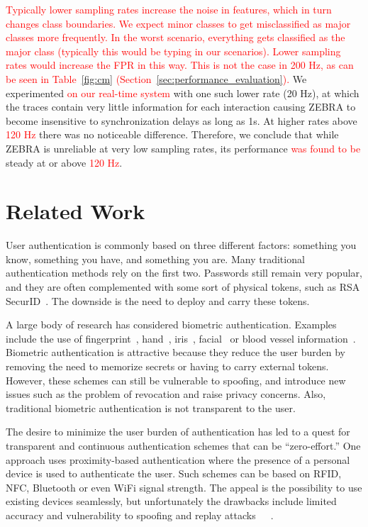 \documentclass[conference]{IEEEtran}
\newcommand{\zebra}{ZEBRA\xspace}
\newcommand\changeMika[1]{\textcolor{red}{#1}}
\newcommand\changeMika[1]{{#1}}
\begin{document}
\changeMika{Typically lower sampling rates increase the noise in features, which in turn changes class boundaries. We expect minor classes to get misclassified as major classes more frequently. In the worst scenario, everything gets classified as the major class (typically this would be typing in our scenarios). Lower sampling rates would increase the FPR in this way. This is not the case in 200 Hz, as can be seen in Table~\ref{fig:cm} (Section~\ref{sec:performance_evaluation}).}
We experimented \changeMika{on our real-time system} with one such lower rate (20 Hz), at which the traces contain very little information for each interaction causing \zebra to become insensitive to synchronization delays as long as 1s. 
At higher rates above \changeMika{120 Hz} there was no noticeable difference. Therefore, we conclude that while \zebra is unreliable at very low sampling rates, its performance \changeMika{was found to be} steady at or above \changeMika{120 Hz}. 





 
\section{Related Work}

User authentication is commonly based on three different factors: something you know, something you have, and something you are. Many traditional authentication methods rely on the first two. Passwords still remain very popular, and they are often complemented with some sort of physical tokens, such as RSA SecurID~\cite{securid}. The downside is the need to deploy and carry these tokens. 

A large body of research has considered biometric authentication. Examples include the use of fingerprint~\cite{clancy2003secure}, hand~\cite{kumar2009personal}, iris~\cite{chong2005iris}, facial~\cite{beumier2000automatic} or blood vessel information~\cite{watanabe2005palm}. Biometric authentication is attractive because they reduce the user burden by removing the need to memorize secrets or having to carry external tokens. However, these schemes can still be vulnerable to spoofing, and introduce new issues such as the problem of revocation and raise privacy concerns. Also, traditional biometric authentication is not transparent to the user.

The desire to minimize the user burden of authentication has led to a quest for transparent and continuous authentication schemes that can be ``zero-effort.'' One approach uses proximity-based authentication where the presence of a personal device is used to authenticate the user. Such schemes can be based on RFID, NFC, Bluetooth or even WiFi signal strength. The appeal is the possibility to use existing devices seamlessly, but unfortunately the drawbacks include limited accuracy and vulnerability to spoofing and replay attacks~\cite{hancke2005practical}~\cite{hancke2006practical}~\cite{francis2010practical}.
\end{document}
